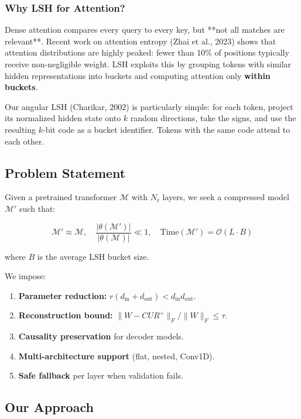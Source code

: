 \subsubsection{Why LSH for Attention?}

Dense attention compares every query to every key, but **not all matches are 
relevant**. Recent work on attention entropy (Zhai et al., 2023) shows that 
attention distributions are highly peaked: fewer than 10\% of positions 
typically receive non-negligible weight. LSH exploits this by grouping tokens 
with similar hidden representations into buckets and computing attention 
only \textbf{within buckets}.

Our angular LSH (Charikar, 2002) is particularly simple: for each token, 
project its normalized hidden state onto $k$ random directions, take the signs, 
and use the resulting $k$-bit code as a bucket identifier. Tokens with the 
same code attend to each other.

\subsection{Problem Statement}

Given a pretrained transformer $\mathcal{M}$ with $N_\ell$ layers, we seek 
a compressed model $\mathcal{M}'$ such that:

\[
\mathcal{M}' \approx \mathcal{M}, \quad
\frac{|\theta(\mathcal{M}')|}{|\theta(\mathcal{M})|} \ll 1, \quad
\text{Time}(\mathcal{M}') = \mathcal{O}(L \cdot B)
\tag{1.2}
\]

where $B$ is the average LSH bucket size.

We impose:

\begin{enumerate}
\item \textbf{Parameter reduction:} $r(d_\text{in} + d_\text{out}) < d_\text{in} d_\text{out}$.
\item \textbf{Reconstruction bound:} $\|W - CUR^+\|_F / \|W\|_F \leq \tau$.
\item \textbf{Causality preservation} for decoder models.
\item \textbf{Multi-architecture support} (flat, nested, Conv1D).
\item \textbf{Safe fallback} per layer when validation fails.

\end{enumerate}
\subsection{Our Approach}

